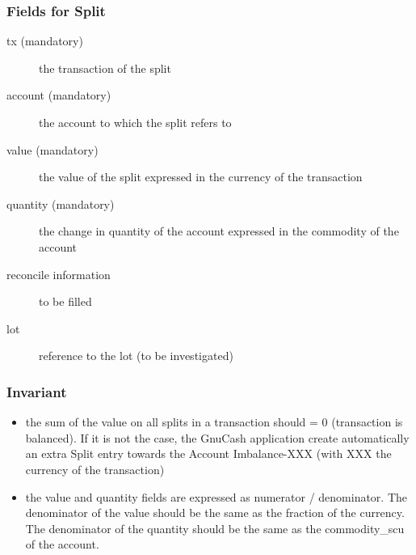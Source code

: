 \documentclass[letterpaper,10pt,english]{sphinxmanual}
\begin{document}
\subsubsection{Fields for Split}
\label{object_model:fields-for-split}\begin{description}
\item[{tx (mandatory)}] \leavevmode
the transaction of the split

\item[{account (mandatory)}] \leavevmode
the account to which the split refers to

\item[{value (mandatory)}] \leavevmode
the value of the split expressed in the currency of the transaction

\item[{quantity (mandatory)}] \leavevmode
the change in quantity of the account expressed in the commodity of the account

\item[{reconcile information}] \leavevmode
to be filled

\item[{lot}] \leavevmode
reference to the lot (to be investigated)

\end{description}


\subsubsection{Invariant}
\label{object_model:id7}\begin{itemize}
\item {} 
the sum of the value on all splits in a transaction should = 0 (transaction is balanced). If it is not the case, the
GnuCash application create automatically an extra Split entry towards the Account Imbalance-XXX (with XXX the currency
of the transaction)

\item {} 
the value and quantity fields are expressed as numerator / denominator. The denominator of the value should be
the same as the fraction of the currency. The denominator of the quantity should be the same as the commodity\_scu of
the account.

\end{itemize}
\end{document}
